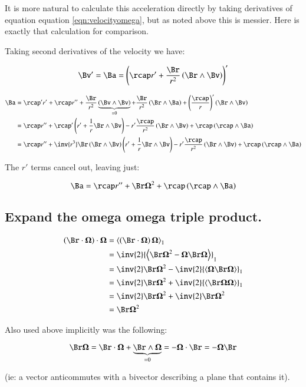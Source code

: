 \documentclass{article}      %
\newcommand{\BOmega}[0]{\boldsymbol{\Omega}}
\newcommand{\gpgrade}[2] {{\left\langle{{#1}}\right\rangle}_{#2}}
\newcommand{\gpgradeone}[1] {\gpgrade{#1}{1}}
\begin{document}
It is more natural to calculate this acceleration directly by taking derivatives of equation
equation \ref{eqn:velocityomega}, but as noted above this is messier.  Here is exactly that calculation for
comparison.

Taking second derivatives of the velocity we have:

\[
\Bv' = \Ba = \left(\rcap r' + \frac{\Br}{r^2} \left(\Br \wedge \Bv\right)\right)'
\]

\begin{align*}
\Ba
&= \rcap' r' + \rcap r'' + \frac{\Br}{r^2} \underbrace{\left(\Bv \wedge \Bv\right)}_{=0} + \frac{\Br}{r^2} \left(\Br \wedge \Ba\right) + \left(\frac{\rcap}{r}\right)' \left(\Br \wedge \Bv\right) \\
&=
\rcap r''
+\rcap'\left( r'  + \frac{1}{r} \Br \wedge \Bv \right)
- r' \frac{\rcap}{r^2} \left(\Br \wedge \Bv\right)
+ \rcap \left(\rcap \wedge \Ba\right)  \\
&=
\rcap r''
+\inv{r^3} \Br\left( \Br \wedge \Bv\right) \left( r'  + \frac{1}{r} \Br \wedge \Bv \right)
- r' \frac{\rcap}{r^2} \left(\Br \wedge \Bv\right)
+ \rcap \left(\rcap \wedge \Ba\right)  \\
\end{align*}

The $r'$ terms cancel out, leaving just:

\[
\Ba = \rcap r'' + \Br \BOmega^2 +
\rcap \left(\rcap \wedge \Ba\right)
\]

\subsection{ Expand the omega omega triple product. }

\begin{align*}
\left(\Br \cdot \BOmega\right) \cdot \BOmega
&= \gpgradeone{ \left(\Br \cdot \BOmega\right) \BOmega } \\
&= \inv{2} \gpgradeone{ \Br \BOmega^2 - \BOmega \Br \BOmega } \\
&= \inv{2} \Br \BOmega^2 - \inv{2}\gpgradeone{ \BOmega \Br \BOmega } \\
&= \inv{2} \Br \BOmega^2 + \inv{2}\gpgradeone{ \Br \BOmega \BOmega } \\
&= \inv{2} \Br \BOmega^2 + \inv{2}\Br \BOmega^2 \\
&= \Br \BOmega^2 \\
\end{align*}

Also used above implicitly was the following:

\[
\Br \BOmega = \Br \cdot \BOmega + \underbrace{\Br \wedge \BOmega}_{=0} = -\BOmega \cdot \Br = -\BOmega \Br
\]

(ie: a vector anticommutes with a bivector describing a plane that contains it).
\end{document}
